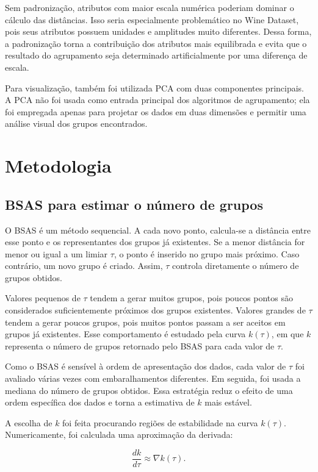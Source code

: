 \documentclass[12pt,a4paper]{article}
\begin{document}
Sem padronização, atributos com maior escala numérica poderiam dominar o cálculo
das distâncias. Isso seria especialmente problemático no Wine Dataset, pois seus
atributos possuem unidades e amplitudes muito diferentes. Dessa forma, a
padronização torna a contribuição dos atributos mais equilibrada e evita que o
resultado do agrupamento seja determinado artificialmente por uma diferença de
escala.

Para visualização, também foi utilizada PCA com duas componentes principais. A
PCA não foi usada como entrada principal dos algoritmos de agrupamento; ela foi
empregada apenas para projetar os dados em duas dimensões e permitir uma análise
visual dos grupos encontrados.

\section{Metodologia}

\subsection{BSAS para estimar o número de grupos}

O BSAS é um método sequencial. A cada novo ponto, calcula-se a distância entre
esse ponto e os representantes dos grupos já existentes. Se a menor distância
for menor ou igual a um limiar $\tau$, o ponto é inserido no grupo mais próximo.
Caso contrário, um novo grupo é criado. Assim, $\tau$ controla diretamente o
número de grupos obtidos.

Valores pequenos de $\tau$ tendem a gerar muitos grupos, pois poucos pontos são
considerados suficientemente próximos dos grupos existentes. Valores grandes de
$\tau$ tendem a gerar poucos grupos, pois muitos pontos passam a ser aceitos em
grupos já existentes. Esse comportamento é estudado pela curva
$k(\tau)$, em que $k$ representa o número de grupos retornado pelo BSAS para
cada valor de $\tau$.

Como o BSAS é sensível à ordem de apresentação dos dados, cada valor de $\tau$
foi avaliado várias vezes com embaralhamentos diferentes. Em seguida, foi usada
a mediana do número de grupos obtidos. Essa estratégia reduz o efeito de uma
ordem específica dos dados e torna a estimativa de $k$ mais estável.

A escolha de $k$ foi feita procurando regiões de estabilidade na curva
$k(\tau)$. Numericamente, foi calculada uma aproximação da derivada:

\begin{equation}
    \frac{dk}{d\tau} \approx \nabla k(\tau).
\end{equation}
\end{document}
